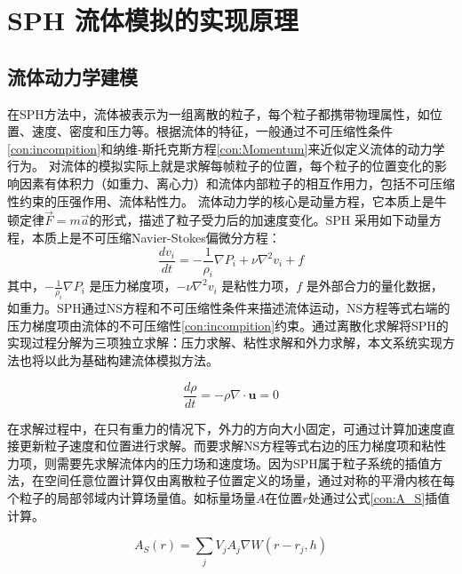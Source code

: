 \section{SPH 流体模拟的实现原理}

\subsection{流体动力学建模}

在SPH方法中，流体被表示为一组离散的粒子，每个粒子都携带物理属性，如位置、速度、密度和压力等。根据流体的特征，一般通过不可压缩性条件\eqref{con:incompition}和纳维-斯托克斯方程\eqref{con:Momentum}来近似定义流体的动力学行为。
对流体的模拟实际上就是求解每帧粒子的位置，每个粒子的位置变化的影响因素有体积力（如重力、离心力）和流体内部粒子的相互作用力，包括不可压缩性约束的压强作用、流体粘性力。
流体动力学的核心是动量方程，它本质上是牛顿定律$\vec{F}=m\vec{a}$的形式，描述了粒子受力后的加速度变化。SPH 采用如下动量方程，本质上是不可压缩Navier-Stokes偏微分方程：
\begin{equation}
    \frac{d v_i}{dt} = -\frac{1}{\rho_i} \nabla P_i + \nu \nabla^2 v_i + f\label{con:Momentum}
\end{equation}
其中，$-\frac{1}{\rho_i} \nabla P_i$ 是压力梯度项，$- \nu \nabla^2 v_i$ 是粘性力项，$f$ 是外部合力的量化数据，如重力。SPH通过NS方程和不可压缩性条件来描述流体运动，NS方程等式右端的压力梯度项由流体的不可压缩性\eqref{con:incompition}约束。通过离散化求解将SPH的实现过程分解为三项独立求解：压力求解、粘性求解和外力求解，本文系统实现方法也将以此为基础构建流体模拟方法。

\begin{equation}
    \frac{d\rho}{dt} = -\rho\nabla \cdot \mathbf{u} = 0\label{con:incompition}
\end{equation}

在求解过程中，在只有重力的情况下，外力的方向大小固定，可通过计算加速度直接更新粒子速度和位置进行求解。而要求解NS方程等式右边的压力梯度项和粘性力项，则需要先求解流体内的压力场和速度场。因为SPH属于粒子系统的插值方法，在空间任意位置计算仅由离散粒子位置定义的场量，通过对称的平滑内核在每个粒子的局部邻域内计算场量值。如标量场量$A$在位置$r$处通过公式\eqref{con:A_S}插值计算。

\begin{equation}
    A_S(r) = \sum_j V_j A_j \nabla W(r - r_j, h)\label{con:A_S}
\end{equation}

